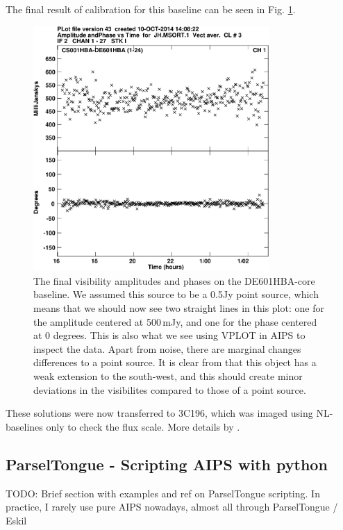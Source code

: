 The final result of calibration for this baseline can be seen in Fig. \ref{fig:vplot}.
\begin{figure}[htbp]
\centering
    \includegraphics[width=0.8\textwidth]{figs/J0958Hvplot-crop.pdf}
\caption{
The final visibility amplitudes and phases on the DE601HBA-core baseline. We
assumed this source to be a 0.5Jy point source, which means that we should now
see two straight lines in this plot: one for the amplitude centered at
500\,mJy, and one for the phase centered at 0 degrees. This is also what we see
using VPLOT in AIPS to inspect the data. Apart from noise, there are marginal
changes differences to a point source. It is clear from \cite{varenius2014}
that this object has a weak extension to the south-west, and this should create
minor deviations in the visibilites compared to those of a point source.
\label{fig:vplot}
}
\end{figure}

These solutions were now transferred to 3C196, which was imaged using NL-baselines only
to check the flux scale. More details by \cite{varenius2014}.

\subsection{ParselTongue - Scripting AIPS with python}
\label{sect:parseltongue}
TODO: Brief section with examples and ref on ParselTongue scripting. In practice,
I rarely use pure AIPS nowadays, almost all through ParselTongue / Eskil

